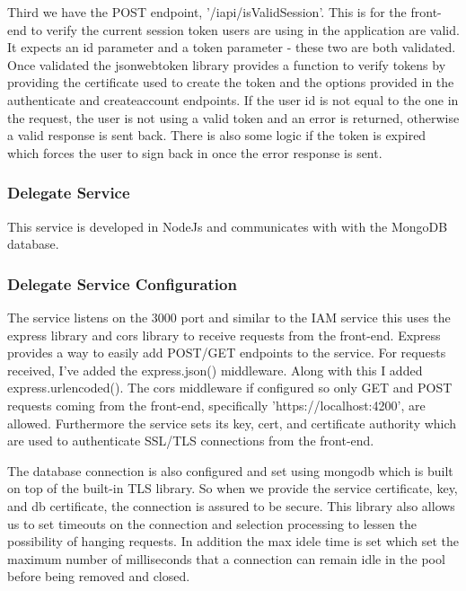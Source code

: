 \documentclass[12pt]{article}
\begin{document}
Third we have the POST endpoint, '/iapi/isValidSession'. This is for the front-end to verify the current session token users are using in the application are valid. It expects an id parameter and a token parameter - these two are both validated. Once validated the jsonwebtoken library provides a function to verify tokens by providing the certificate used to create the token and the options provided in the authenticate and createaccount endpoints. If the user id is not equal to the one in the request, the user is not using a valid token and an error is returned, otherwise a valid response is sent back. There is also some logic if the token is expired which forces the user to sign back in once the error response is sent.

\subsubsection{Delegate Service}
This service is developed in NodeJs and communicates with with the MongoDB database.

\subsubsection{Delegate Service Configuration}
The service listens on the 3000 port and similar to the IAM service this uses the express library and cors library to receive requests from the front-end. Express provides a way to easily add POST/GET endpoints to the service. For requests received, I've added the express.json() middleware. Along with this I added express.urlencoded(). The cors middleware if configured so only GET and POST requests coming from the front-end, specifically 'https://localhost:4200', are allowed. Furthermore the service sets its key, cert, and certificate authority which are used to authenticate SSL/TLS connections from the front-end.

The database connection is also configured and set using mongodb which is built on top of the built-in TLS library. So when we provide the service certificate, key, and db certificate, the connection is assured to be secure. This library also allows us to set timeouts on the connection and selection processing to lessen the possibility of hanging requests. In addition the max idele time is set which set the maximum number of milliseconds that a connection can remain idle in the pool before being removed and closed.
\end{document}
